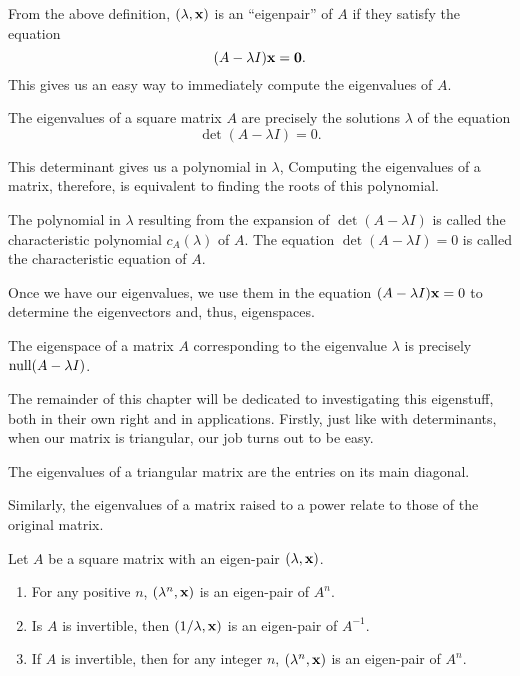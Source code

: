 \documentclass[../m073main.tex]{subfiles}
\begin{document}
From the above definition, $(\lambda, \mathbf{x})$ is an ``eigenpair'' of $A$ if they satisfy the equation
\[ (A - \lambda I) \mathbf{x} = \mathbf{0}. \]
This gives us an easy way to immediately compute the eigenvalues of $A$.

\begin{theorem}
	The eigenvalues of a square matrix $A$ are precisely the solutions $\lambda$ of the equation
	\[ \det (A - \lambda I) = 0. \]
\end{theorem}

This determinant gives us a polynomial in $\lambda$,
Computing the eigenvalues of a matrix, therefore, is equivalent to finding the roots of this polynomial.

\begin{definition}
	The polynomial in $\lambda$ resulting from the expansion of $\det (A - \lambda I)$ is called the characteristic polynomial $c_A (\lambda)$ of $A$.
	The equation $\det (A - \lambda I) = 0$ is called the characteristic equation of $A$.
\end{definition}

Once we have our eigenvalues, we use them in the equation $(A - \lambda I) \mathbf{x} = 0$ to determine the eigenvectors and, thus, eigenspaces.

\begin{theorem}
	The eigenspace of a matrix $A$ corresponding to the eigenvalue $\lambda$ is precisely $\textrm{null} (A - \lambda I)$.
\end{theorem}

The remainder of this chapter will be dedicated to investigating this eigenstuff, both in their own right and in applications.
Firstly, just like with determinants, when our matrix is triangular, our job turns out to be easy.

\begin{theorem}
	The eigenvalues of a triangular matrix are the entries on its main diagonal.
\end{theorem}

Similarly, the eigenvalues of a matrix raised to a power relate to those of the original matrix.

\pagebreak

\begin{theorem}
	Let $A$ be a square matrix with an eigen-pair $(\lambda, \mathbf{x})$.
	\begin{enumerate}[label=(\alph*)]
		\item For any positive $n$, $(\lambda^n, \mathbf{x})$ is an eigen-pair of $A^n$.
		\item Is $A$ is invertible, then $(1/\lambda, \mathbf{x})$ is an eigen-pair of $A^{-1}$.
		\item If $A$ is invertible, then for any integer $n$, $(\lambda^n, \mathbf{x})$ is an eigen-pair of $A^n$.
	\end{enumerate}
\end{theorem}
\end{document}
